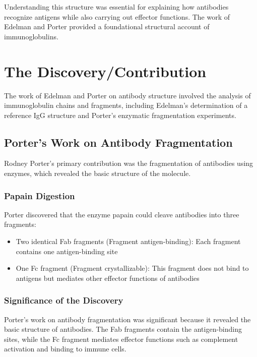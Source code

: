 Understanding this structure was essential for explaining how antibodies recognize antigens while also carrying out effector functions. The work of Edelman and Porter provided a foundational structural account of immunoglobulins.

\section{The Discovery/Contribution}

The work of Edelman and Porter on antibody structure involved the analysis of immunoglobulin chains and fragments, including Edelman's determination of a reference IgG structure and Porter's enzymatic fragmentation experiments.

\subsection{Porter's Work on Antibody Fragmentation}

Rodney Porter's primary contribution was the fragmentation of antibodies using enzymes, which revealed the basic structure of the molecule.

\subsubsection{Papain Digestion}

Porter discovered that the enzyme papain could cleave antibodies into three fragments:

\begin{itemize}
\item Two identical Fab fragments (Fragment antigen-binding): Each fragment contains one antigen-binding site
\item One Fc fragment (Fragment crystallizable): This fragment does not bind to antigens but mediates other effector functions of antibodies
\end{itemize}

\subsubsection{Significance of the Discovery}

Porter's work on antibody fragmentation was significant because it revealed the basic structure of antibodies. The Fab fragments contain the antigen-binding sites, while the Fc fragment mediates effector functions such as complement activation and binding to immune cells.

